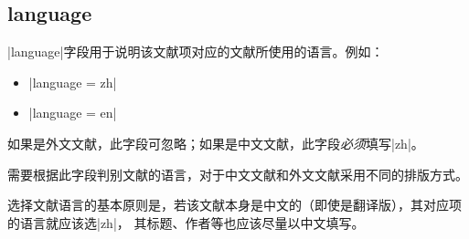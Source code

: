 \subsection{language}\label{subsec:bibfield-language}

|language|字段用于说明该文献项对应的文献所使用的语言。例如：
\begin{itemize}
\item |language = {zh}|
\item |language = {en}|
\end{itemize}

如果是外文文献，此字段可忽略；如果是中文文献，此字段\emph{必须}填写|zh|。

{\BibTeX}需要根据此字段判别文献的语言，对于中文文献和外文文献采用不同的排版方式。

选择文献语言的基本原则是，若该文献本身是中文的（即使是翻译版），其对应项的语言就应该选|zh|，
其标题、作者等也应该尽量以中文填写。


